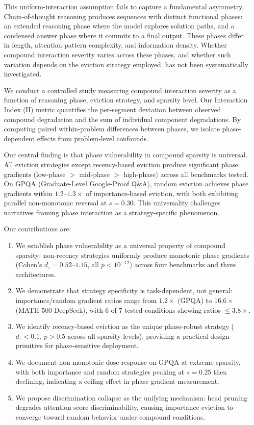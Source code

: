 \documentclass[11pt,a4paper]{article}
\begin{document}
This uniform-interaction assumption fails to capture a fundamental asymmetry. Chain-of-thought reasoning produces sequences with distinct functional phases: an extended reasoning phase where the model explores solution paths, and a condensed answer phase where it commits to a final output. These phases differ in length, attention pattern complexity, and information density. Whether compound interaction severity varies across these phases, and whether such variation depends on the eviction strategy employed, has not been systematically investigated.

We conduct a controlled study measuring compound interaction severity as a function of reasoning phase, eviction strategy, and sparsity level. Our Interaction Index (II) metric quantifies the per-segment deviation between observed compound degradation and the sum of individual component degradations. By computing paired within-problem differences between phases, we isolate phase-dependent effects from problem-level confounds.

Our central finding is that phase vulnerability in compound sparsity is universal. All eviction strategies except recency-based eviction produce significant phase gradients (low-phase $>$ mid-phase $>$ high-phase) across all benchmarks tested. On GPQA (Graduate-Level Google-Proof Q\&A), random eviction achieves phase gradients within $1.2$--$1.3\times$ of importance-based eviction, with both exhibiting parallel non-monotonic reversal at $s=0.30$. This universality challenges narratives framing phase interaction as a strategy-specific phenomenon.

Our contributions are:
\begin{enumerate}
    \item We establish phase vulnerability as a universal property of compound sparsity: non-recency strategies uniformly produce monotonic phase gradients (Cohen's $d_z = 0.52$--$1.15$, all $p < 10^{-12}$) across four benchmarks and three architectures.
    \item We demonstrate that strategy specificity is task-dependent, not general: importance/random gradient ratios range from $1.2\times$ (GPQA) to $16.6\times$ (MATH-500 DeepSeek), with 6 of 7 tested conditions showing ratios $\leq 3.8\times$.
    \item We identify recency-based eviction as the unique phase-robust strategy ($d_z < 0.1$, $p > 0.5$ across all sparsity levels), providing a practical design primitive for phase-sensitive deployment.
    \item We document non-monotonic dose-response on GPQA at extreme sparsity, with both importance and random strategies peaking at $s=0.25$ then declining, indicating a ceiling effect in phase gradient measurement.
    \item We propose discrimination collapse as the unifying mechanism: head pruning degrades attention score discriminability, causing importance eviction to converge toward random behavior under compound conditions.
\end{enumerate}
\end{document}
